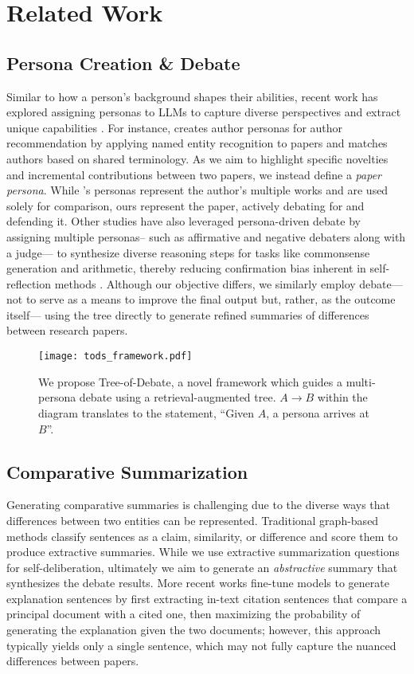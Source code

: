 \section{Related Work}
\subsection{Persona Creation \& Debate} Similar to how a person's background shapes their abilities, recent work has explored assigning personas to LLMs to capture diverse perspectives and extract unique capabilities \cite{self-play}. For instance, \citet{bridger} creates author personas for author recommendation by applying named entity recognition to papers and matches authors based on shared terminology. As we aim to highlight specific novelties and incremental contributions between two papers, we instead define a \textit{paper persona}. While \citet{bridger}'s personas represent the author's multiple works and are used solely for comparison, ours represent the paper, actively debating for and defending it. Other studies have also leveraged persona-driven debate by assigning multiple personas-- such as affirmative and negative debaters along with a judge--- to synthesize diverse reasoning steps for tasks like commonsense generation and arithmetic, thereby reducing confirmation bias inherent in self-reflection methods \cite{liang2023encouraging}. Although our objective differs, we similarly employ debate--- not to serve as a means to improve the final output but, rather, as the outcome itself--- using the tree directly to generate refined summaries of differences between research papers.

\begin{figure*}[ht!]
    \centering
    \texttt{[image: tods\_framework.pdf]}
    \caption{
    \label{fig:tree} We propose Tree-of-Debate, a novel framework which guides a multi-persona debate using a retrieval-augmented tree. $A \rightarrow B$ 
within the diagram translates to the statement, ``Given $A$, a persona arrives at $B$''.}
\end{figure*}

\subsection{Comparative Summarization} Generating comparative summaries is challenging due to the diverse ways that differences between two entities can be represented. Traditional graph-based methods \cite{comparative_graph, Strhle2023} classify sentences as a claim, similarity, or difference and score them to produce extractive summaries. While we use extractive summarization questions for self-deliberation, ultimately we aim to generate an \textit{abstractive} summary that synthesizes the debate results. More recent works \cite{explainingrelationships} fine-tune models to generate explanation sentences by first extracting in-text citation sentences that compare a principal document with a cited one, then maximizing the probability of generating the explanation given the two documents; however, this approach typically yields only a single sentence, which may not fully capture the nuanced differences between papers.

